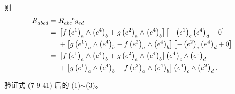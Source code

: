 \begin{xiti}
\begin{zm}
\begin{Proof}
\begin{equation*}
				\end{equation*}
				则
				\begin{equation*}
					\begin{split}
						\tensor{R}{_a_b_c_d} ={}& \tensor{R}{_a_b_c^e} \tensor{g}{_e_d}\\
						={}& \left[ f \tensor{\left( e^1 \right)}{_a} \wedge \tensor{\left( e^4 \right)}{_b} + g \tensor{\left( e^2 \right)}{_a} \wedge \tensor{\left( e^4 \right)}{_b} \right] \left[ - \tensor{\left( e^1 \right)}{_c} \tensor{\left( e^4 \right)}{_d} + 0 \right]\\
						&{}+ \left[ g \tensor{\left( e^1 \right)}{_a} \wedge \tensor{\left( e^4 \right)}{_b} - f \tensor{\left( e^2 \right)}{_a} \wedge \tensor{\left( e^4 \right)}{_b} \right] \left[ - \tensor{\left( e^2 \right)}{_c} \tensor{\left( e^4 \right)}{_d} + 0 \right]\\
						={}& \left[ f \tensor{\left( e^1 \right)}{_a} \wedge \tensor{\left( e^4 \right)}{_b} + g \tensor{\left( e^2 \right)}{_a} \wedge \tensor{\left( e^4 \right)}{_b} \right] \tensor{\left( e^4 \right)}{_c} \wedge \tensor{\left( e^1 \right)}{_d}\\
						& {}+ \left[ g \tensor{\left( e^1 \right)}{_a} \wedge \tensor{\left( e^4 \right)}{_b} - f \tensor{\left( e^2 \right)}{_a} \wedge \tensor{\left( e^4 \right)}{_b} \right] \tensor{\left( e^4 \right)}{_c} \wedge \tensor{\left( e^2 \right)}{_d}.
					\end{split}
				\end{equation*}
			\end{Proof}
		\end{zm}

	\item 验证式 (7-9-41) 后的 (1)$\sim$(3)。


\end{xiti}
